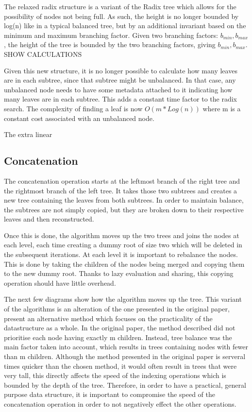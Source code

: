 \documentclass[11pt,a4paper,oneside]{article}
\begin{document}
The relaxed radix structure is a variant of the Radix tree which allows for the possibility of nodes not being full. As such, the height is no longer bounded by log(n) like in a typical balanced tree, but by an additional invariant based on the minimum and maximum branching factor. Given two branching factors: $b_{min}, b_{max}$, the height of the tree is bounded by the two branching factors, giving $b_{min}, b_{max}$. 
SHOW CALCULATIONS

Given this new structure, it is no longer possible to calculate how many leaves are in each subtree, since that subtree might be unbalanced. In that case, any unbalanced node needs to have some metadata attached to it indicating how many leaves are in each subtree. This adds a constant time factor to the radix search. The complexity of finding a leaf is now $O(m * Log(n))$ where m is a constant cost associated with an unbalanced node. 

The extra linear 

\subsection*{Concatenation}

The concatenation operation starts at the leftmost branch of the right tree and the rightmost branch of the left tree. It takes those two subtrees and creates a new tree containing the leaves from both subtrees. In order to maintain balance, the subtrees are not simply copied, but they are broken down to their respective leaves and then reconstructed.


Once this is done, the algorithm moves up the two trees and joins the nodes at each level, each time creating a dummy root of size two which will be deleted in the subsequent iterations. At each level it is important to rebalance the nodes. This is done by taking the children of the nodes being merged and copying them to the new dummy root. Thanks to lazy evaluation and sharing, this copying operation should have little overhead.


The next few diagrams show how the algorithm moves up the tree. This variant of the algorithms is an alteration of the one presented in the original paper\citep{bagwell2011rrb}, \cite{stucki2015rrb} present an alternative method which focuses on the practicality of the datastructure as a whole. In the original paper, the method described did not prioritise each node having exactly m children. Instead, tree balance was the main factor taken into account, which results in trees containing nodes with fewer than m children. Although the method presented in the original paper is serveral times quicker than the chosen method, it would often result in trees that were very tall, this directly affects the speed of the indexing operations which is bounded by the depth of the tree. Therefore, in order to have a practical, general purpose data structure, it is important to compromise the speed of the concatenation operation in order to not negatively effect the other operations.
\end{document}
